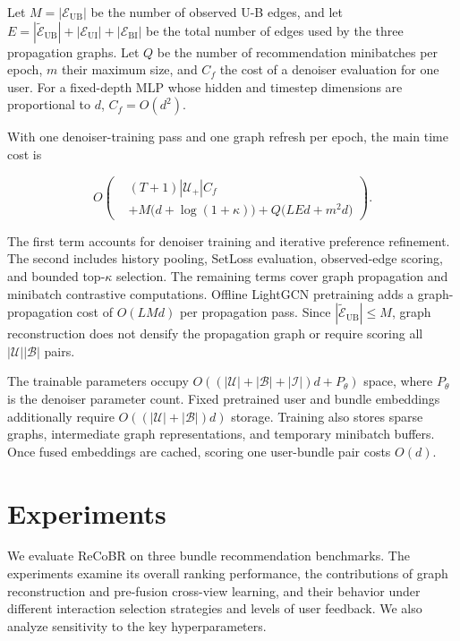 \documentclass[letterpaper]{article}
\begin{document}
Let $M=|\mathcal E_{\mathrm{UB}}|$ be the number of observed U-B edges, and let $E=|\widetilde{\mathcal E}_{\mathrm{UB}}|+|\mathcal E_{\mathrm{UI}}|+|\mathcal E_{\mathrm{BI}}|$ be the total number of edges used by the three propagation graphs. Let $Q$ be the number of recommendation minibatches per epoch, $m$ their maximum size, and $C_f$ the cost of a denoiser evaluation for one user. For a fixed-depth MLP whose hidden and timestep dimensions are proportional to $d$, $C_f=O(d^2)$.

With one denoiser-training pass and one graph refresh per epoch, the main time cost is

\begin{equation}
O\!\left(
\begin{aligned}
&(T+1)|\mathcal U_+|C_f\\
&+M\bigl(d+\log(1+\kappa)\bigr)
+Q\bigl(LEd+m^2d\bigr)
\end{aligned}
\right).
\tag{16}
\end{equation}

The first term accounts for denoiser training and iterative preference refinement. The second includes history pooling, SetLoss evaluation, observed-edge scoring, and bounded top-$\kappa$ selection. The remaining terms cover graph propagation and minibatch contrastive computations. Offline LightGCN pretraining adds a graph-propagation cost of $O(LMd)$ per propagation pass. Since $|\widetilde{\mathcal E}_{\mathrm{UB}}|\leq M$, graph reconstruction does not densify the propagation graph or require scoring all $|\mathcal U||\mathcal B|$ pairs.

The trainable parameters occupy $O((|\mathcal U|+|\mathcal B|+|\mathcal I|)d+P_\theta)$ space, where $P_\theta$ is the denoiser parameter count. Fixed pretrained user and bundle embeddings additionally require $O((|\mathcal U|+|\mathcal B|)d)$ storage. Training also stores sparse graphs, intermediate graph representations, and temporary minibatch buffers. Once fused embeddings are cached, scoring one user-bundle pair costs $O(d)$.


\section{Experiments}

We evaluate ReCoBR on three bundle recommendation benchmarks.
The experiments examine its overall ranking performance, the
contributions of graph reconstruction and pre-fusion cross-view
learning, and their behavior under different interaction
selection strategies and levels of user feedback. We also
analyze sensitivity to the key hyperparameters.
\end{document}
